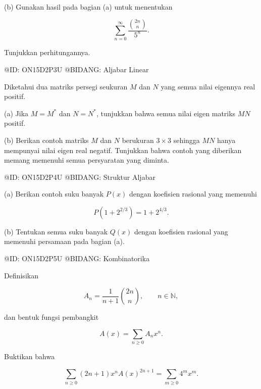 (b) Gunakan hasil pada bagian (a) untuk menentukan

$$
\sum_{n=0}^{\infty}\frac{\binom{2n}{n}}{5^n}.
$$

Tunjukkan perhitungannya.

@ID: ON15D2P3U
@BIDANG: Aljabar Linear

Diketahui dua matriks persegi seukuran $M$ dan $N$ yang semua nilai eigennya real positif.

(a) Jika $M=M^\ast$ dan $N=N^\ast$, tunjukkan bahwa semua nilai eigen matriks $MN$ positif.

(b) Berikan contoh matriks $M$ dan $N$ berukuran $3\times3$ sehingga $MN$ hanya mempunyai nilai eigen real negatif. Tunjukkan bahwa contoh yang diberikan memang memenuhi semua persyaratan yang diminta.

@ID: ON15D2P4U
@BIDANG: Struktur Aljabar

(a) Berikan contoh suku banyak $P(x)$ dengan koefisien rasional yang memenuhi

$$
P\!\left(1+2^{2/3}\right)=1+2^{4/3}.
$$

(b) Tentukan semua suku banyak $Q(x)$ dengan koefisien rasional yang memenuhi persamaan pada bagian (a).

@ID: ON15D2P5U
@BIDANG: Kombinatorika

Definisikan

$$
A_n=\frac{1}{n+1}\binom{2n}{n},
\qquad n\in\mathbb N,
$$

dan bentuk fungsi pembangkit

$$
A(x)=\sum_{n\ge0}A_nx^n.
$$

Buktikan bahwa

$$
\sum_{n\ge0}(2n+1)x^nA(x)^{2n+1}
=
\sum_{m\ge0}4^m x^m.
$$